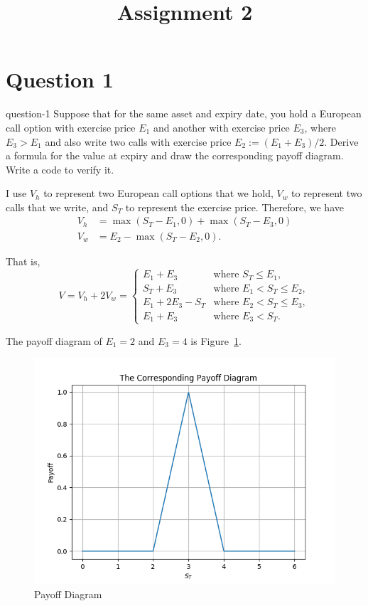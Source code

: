 \title{Assignment 2}
\maketitle\tableofcontents

\section{Question 1}
\begin{statebox}{}{question-1}
    Suppose that for the same asset and expiry date, you hold a European call option with exercise price $E_1$ and another with exercise price $E_3$, where $E_3>E_1$ and also write two calls with exercise price $E_2:=(E_1+E_3)/2$. Derive a formula for the value at expiry and draw the corresponding payoff diagram. Write a code to verify it.
\end{statebox}
I use $V_h$ to represent two European call options that we hold, $V_w$ to represent two calls that we write, and $S_T$ to represent the exercise price. Therefore, we have
\begin{equation}\label{E:value-at-expiry-1}
    \begin{aligned}
        V_h &= \max(S_T-E_1, 0) + \max(S_T-E_3, 0) \\
        V_w &= E_2 - \max(S_T-E_2, 0).
    \end{aligned}
\end{equation}

That is,
\begin{equation}\label{E:value-at-expiry-2}
    V = V_h + 2V_w = \begin{cases}
        E_1+E_3 & \text{where } S_T\leq E_1, \\
        S_T+E_3 & \text{where } E_1<S_T\leq E_2, \\
        E_1+2E_3-S_T & \text{where } E_2<S_T\leq E_3, \\
        E_1+E_3 & \text{where } E_3<S_T.
    \end{cases}
\end{equation}

The payoff diagram of $E_1=2$ and $E_3=4$ is Figure~\ref{F:payoff-diagram}.
\begin{figure}[H]
    \centering
    \includegraphics[width=.7\textwidth]{figures/2019-09-27-payoff-diagram.png}
    \caption{Payoff Diagram}\label{F:payoff-diagram}
\end{figure}

